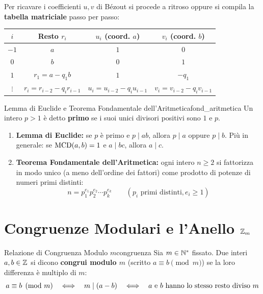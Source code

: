 Per ricavare i coefficienti $u, v$ di Bézout si procede a ritroso oppure si compila la \textbf{tabella matriciale} passo per passo:
\begin{center}
\begin{tabular}{|c|c|c|c|}
\hline
$i$ & Resto $r_i$ & $u_i$ (coord. $a$) & $v_i$ (coord. $b$) \\
\hline
$-1$ & $a$ & $1$ & $0$ \\
$0$ & $b$ & $0$ & $1$ \\
$1$ & $r_1 = a - q_1 b$ & $1$ & $-q_1$ \\
$\vdots$ & $r_i = r_{i-2} - q_i r_{i-1}$ & $u_i = u_{i-2} - q_i u_{i-1}$ & $v_i = v_{i-2} - q_i v_{i-1}$ \\
\hline
\end{tabular}
\end{center}

\begin{teorema}{Lemma di Euclide e Teorema Fondamentale dell'Aritmetica}{fond_aritmetica}
Un intero $p > 1$ è detto \textbf{primo} se i suoi unici divisori positivi sono $1$ e $p$.
\begin{enumerate}
    \item \textbf{Lemma di Euclide:} se $p$ è primo e $p \mid ab$, allora $p \mid a$ oppure $p \mid b$.
    Più in generale: se $\operatorname{MCD}(a, b) = 1$ e $a \mid bc$, allora $a \mid c$.
    \item \textbf{Teorema Fondamentale dell'Aritmetica:} ogni intero $n \ge 2$ si fattorizza in modo unico (a meno dell'ordine dei fattori) come prodotto di potenze di numeri primi distinti:
    \[
        n = p_1^{e_1} p_2^{e_2} \cdots p_k^{e_k} \qquad (p_i \text{ primi distinti}, e_i \ge 1)
    \]
\end{enumerate}
\end{teorema}

\section{Congruenze Modulari e l'Anello $\mathbb{Z}_m$}

\begin{definizione}{Relazione di Congruenza Modulo $m$}{congruenza}
Sia $m \in \mathbb{N}^*$ fissato. Due interi $a, b \in \mathbb{Z}$ si dicono \textbf{congrui modulo $m$} (scritto $a \equiv b \pmod m$) se la loro differenza è multiplo di $m$:
\[
    a \equiv b \pmod m \quad \Longleftrightarrow \quad m \mid (a - b) \quad \Longleftrightarrow \quad a \text{ e } b \text{ hanno lo stesso resto diviso } m
\]
\end{definizione}

